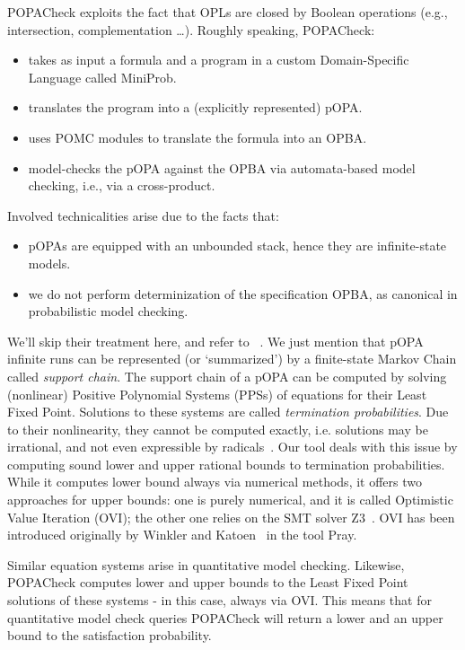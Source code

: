 \documentclass[9pt,a4paper]{article}
\begin{document}
POPACheck exploits the fact that OPLs are closed by Boolean operations (e.g., intersection, complementation \dots). Roughly speaking, POPACheck:
\begin{itemize}
    \item takes as input a formula and a program in a custom Domain-Specific Language called MiniProb.
    \item translates the program into a (explicitly represented) pOPA.
    \item uses POMC modules to translate the formula into an OPBA.
    \item model-checks the pOPA against the OPBA via automata-based model checking, i.e., via a cross-product.
\end{itemize} 
Involved technicalities arise due to the facts that:
\begin{itemize}
    \item pOPAs are equipped with an unbounded stack, hence they are infinite-state models.
    \item we do not perform determinization of the specification OPBA, as canonical in probabilistic model checking.
\end{itemize}
We'll skip their treatment here, and refer to ~\cite{abs-2404-03515}. We just mention that pOPA infinite runs can be represented (or `summarized') by a finite-state Markov Chain called \emph{support chain}. The support chain of a pOPA can be computed by solving (nonlinear) Positive Polynomial Systems (PPSs) of equations for their Least Fixed Point. Solutions to these systems are called \emph{termination probabilities}. Due to their nonlinearity, they cannot be computed exactly, i.e. solutions may be irrational, and not even expressible by radicals~\cite{EtessamiY09}. Our tool deals with this issue by computing sound lower and upper rational bounds to termination probabilities. While it computes lower bound always via numerical methods, it offers two approaches for upper bounds: one is purely numerical, and it is called Optimistic Value Iteration (OVI); the other one relies on the SMT solver Z3~\cite{z3}. OVI has been introduced originally by Winkler and Katoen~\cite{WinklerK23a} in the tool Pray.

Similar equation systems arise in quantitative model checking. Likewise, POPACheck computes lower and upper bounds to the Least Fixed Point solutions of these systems - in this case, always via OVI. This means that for quantitative model check queries POPACheck will return a lower and an upper bound to the satisfaction probability.
\end{document}
